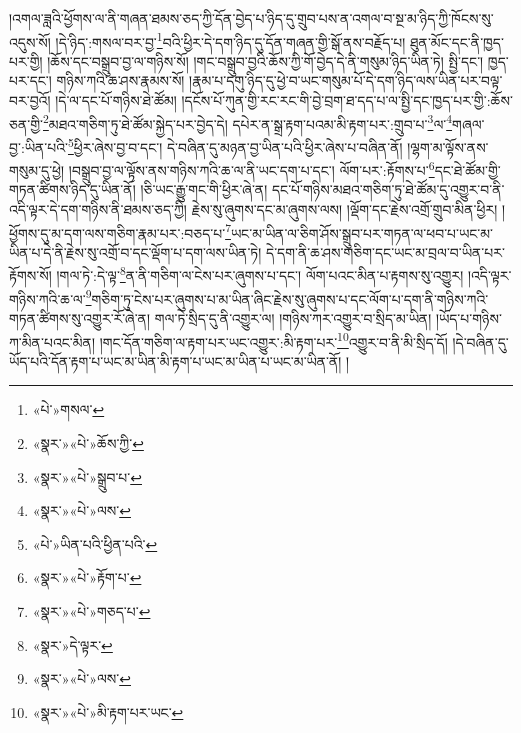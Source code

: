 །འགལ་ཟླའི་ཕྱོགས་ལ་ནི་གཞན་ཐམས་ཅད་ཀྱི་དོན་བྱེད་པ་ཉིད་དུ་གྲུབ་པས་ན་འགལ་བ་སྔ་མ་ཉིད་ཀྱི་ཁོངས་སུ་འདུས་སོ། །དེ་ཉིད་:གསལ་བར་བྱ་\footnote{«པེ་»གསལ་}བའི་ཕྱིར་དེ་དག་ཉིད་དུ་དོན་གཞན་གྱི་སྒོ་ནས་བརྗོད་པ། ཐུན་མོང་དང་ནི་ཁྱད་པར་གྱི། །ཆོས་དང་བསྒྲུབ་བྱ་ལ་གཉིས་སོ། །གང་བསྒྲུབ་བྱའི་ཆོས་ཀྱི་གོ་བྱེད་དེ་ནི་གསུམ་ཉིད་ཡིན་ཏེ། སྤྱི་དང་། ཁྱད་པར་དང་། གཉིས་ཀའི་ཆ་ཤས་རྣམས་སོ། །རྣམ་པ་དགུ་ཉིད་དུ་ཕྱེ་བ་ཡང་གསུམ་པོ་དེ་དག་ཉིད་ལས་ཡིན་པར་བལྟ་བར་བྱའོ། །དེ་ལ་དང་པོ་གཉིས་ཐེ་ཚོམ། །དངོས་པོ་ཀུན་གྱི་རང་རང་གི་བྱེ་བྲག་ཐ་དད་པ་ལ་སྤྱི་དང་ཁྱད་པར་གྱི་:ཆོས་ཅན་གྱི་\footnote{«སྣར་»«པེ་»ཆོས་ཀྱི་}མཐའ་གཅིག་ཏུ་ཐེ་ཚོམ་སྐྱེད་པར་བྱེད་དེ། དཔེར་ན་སྒྲ་རྟག་པའམ་མི་རྟག་པར་:གྲུབ་པ་\footnote{«སྣར་»«པེ་»སྒྲུབ་པ་}ལ་\footnote{«སྣར་»«པེ་»ལས་}གཞལ་བྱ་:ཡིན་པའི་\footnote{«པེ་»ཡིན་པའི་ཕྱིན་པའི་}ཕྱིར་ཞེས་བྱ་བ་དང་། དེ་བཞིན་དུ་མཉན་བྱ་ཡིན་པའི་ཕྱིར་ཞེས་པ་བཞིན་ནོ། །ལྷག་མ་ལྟོས་ནས་གསུམ་དུ་ཕྱེ། །བསྒྲུབ་བྱ་ལ་ལྟོས་ནས་གཉིས་ཀའི་ཆ་ལ་ནི་ཡང་དག་པ་དང་། ལོག་པར་:རྟོགས་པ་\footnote{«སྣར་»«པེ་»རྟོག་པ་}དང་ཐེ་ཚོམ་གྱི་གཏན་ཚིགས་ཉིད་དུ་ཡིན་ནོ། །ཅི་ཡང་རྒྱུ་གང་གི་ཕྱིར་ཞེ་ན། དང་པོ་གཉིས་མཐའ་གཅིག་ཏུ་ཐེ་ཚོམ་དུ་འགྱུར་བ་ནི་འདི་ལྟར་དེ་དག་གཉིས་ནི་ཐམས་ཅད་ཀྱི། རྗེས་སུ་ཞུགས་དང་མ་ཞུགས་ལས། །ལྡོག་དང་རྗེས་འགྲོ་གྲུབ་མིན་ཕྱིར། །ཕྱོགས་དུ་མ་དག་ལས་གཅིག་རྣམ་པར་:བཅད་པ་\footnote{«སྣར་»«པེ་»གཅད་པ་}ཡང་མ་ཡིན་ལ་ཅིག་ཤོས་སྒྲུབ་པར་གཏན་ལ་ཕབ་པ་ཡང་མ་ཡིན་པ་དེ་ནི་རྗེས་སུ་འགྲོ་བ་དང་ལྡོག་པ་དག་ལས་ཡིན་ཏེ། དེ་དག་ནི་ཆ་ཤས་གཅིག་དང་ཡང་མ་བྲལ་བ་ཡིན་པར་རྟོགས་སོ། །གལ་ཏེ་:དེ་ལྟ་\footnote{«སྣར་»དེ་ལྟར་}ན་ནི་གཅིག་ལ་ངེས་པར་ཞུགས་པ་དང་། ལོག་པའང་མིན་པ་རྟགས་སུ་འགྱུར། །འདི་ལྟར་གཉིས་ཀའི་ཆ་ལ་\footnote{«སྣར་»«པེ་»ལས་}གཅིག་ཏུ་ངེས་པར་ཞུགས་པ་མ་ཡིན་ཞིང་རྗེས་སུ་ཞུགས་པ་དང་ལོག་པ་དག་ནི་གཉིས་ཀའི་གཏན་ཚིགས་སུ་འགྱུར་རོ་ཞེ་ན། གལ་ཏེ་སྲིད་དུ་ནི་འགྱུར་ལ། །གཉིས་ཀར་འགྱུར་བ་སྲིད་མ་ཡིན། །ཡོད་པ་གཉིས་ཀ་མིན་པའང་མིན། །གང་དོན་གཅིག་ལ་རྟག་པར་ཡང་འགྱུར་:མི་རྟག་པར་\footnote{«སྣར་»«པེ་»མི་རྟག་པར་ཡང་}འགྱུར་བ་ནི་མི་སྲིད་དོ། །དེ་བཞིན་དུ་ཡོད་པའི་དོན་རྟག་པ་ཡང་མ་ཡིན་མི་རྟག་པ་ཡང་མ་ཡིན་པ་ཡང་མ་ཡིན་ནོ། །
